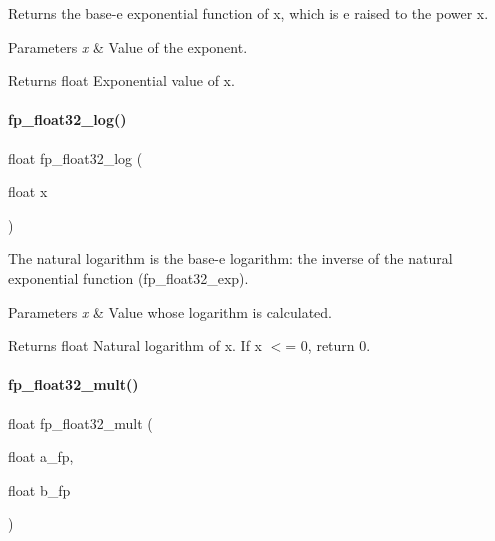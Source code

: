 Returns the base-\/e exponential function of x, which is e raised to the power x. 


\begin{DoxyParams}{Parameters}
{\em x} & Value of the exponent. \\
\hline
\end{DoxyParams}
\begin{DoxyReturn}{Returns}
float Exponential value of x. 
\end{DoxyReturn}
\mbox{\label{a00023_a694db5e30e3f76718f29bacd4e044135}} 
\paragraph{\texorpdfstring{fp\+\_\+float32\+\_\+log()}{fp\_float32\_log()}}
{\footnotesize\ttfamily float fp\+\_\+float32\+\_\+log (\begin{DoxyParamCaption}\item[{float}]{x }\end{DoxyParamCaption})}



The natural logarithm is the base-\/e logarithm\+: the inverse of the natural exponential function (fp\+\_\+float32\+\_\+exp). 


\begin{DoxyParams}{Parameters}
{\em x} & Value whose logarithm is calculated. \\
\hline
\end{DoxyParams}
\begin{DoxyReturn}{Returns}
float Natural logarithm of x. If x $<$= 0, return 0. 
\end{DoxyReturn}
\mbox{\label{a00023_a4fb177861851cf018559768551298993}} 
\paragraph{\texorpdfstring{fp\+\_\+float32\+\_\+mult()}{fp\_float32\_mult()}}
{\footnotesize\ttfamily float fp\+\_\+float32\+\_\+mult (\begin{DoxyParamCaption}\item[{float}]{a\+\_\+fp,  }\item[{float}]{b\+\_\+fp }\end{DoxyParamCaption})}




